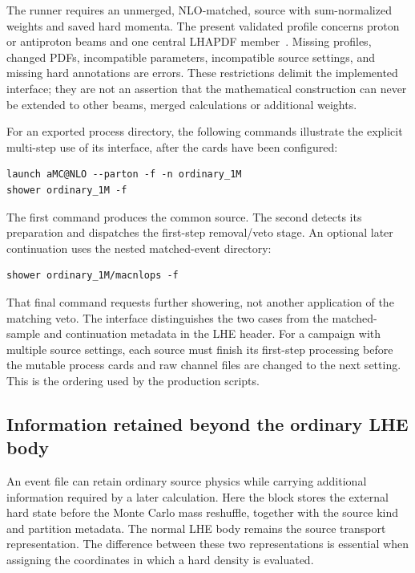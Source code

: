 The runner requires an unmerged, NLO-matched, \pythia{} source with
sum-normalized weights and saved hard momenta.  The present validated
profile concerns proton or antiproton beams and one central LHAPDF
member~\cite{LHAPDF}.  Missing profiles, changed PDFs, incompatible
parameters, incompatible source settings, and missing hard annotations
are errors.  These restrictions delimit the implemented interface;
they are not an assertion that the mathematical construction can never
be extended to other beams, merged calculations or additional weights.

For an exported process directory, the following commands illustrate
the explicit multi-step use of its 
interface, after the cards have been configured:
\begin{verbatim}
launch aMC@NLO --parton -f -n ordinary_1M
shower ordinary_1M -f
\end{verbatim}
The first command produces the common source.  The second detects its
\macnlops{} preparation and dispatches the first-step removal/veto
stage.  An optional later continuation uses the nested matched-event
directory:
\begin{verbatim}
shower ordinary_1M/macnlops -f
\end{verbatim}
That final command requests further showering, not another application
of the matching veto.  The interface distinguishes the two cases from
the matched-sample and continuation metadata in the LHE header.
For a campaign with multiple source settings, each source must finish
its first-step processing before the mutable process cards and raw
channel files are changed to the next setting.  This is the ordering
used by the production scripts.

\subsection{Information retained beyond the ordinary LHE body}
\label{sec:impl-provenance}

An event file can retain ordinary source physics while carrying
additional information required by a later calculation.  Here the
 block stores the external hard
state before the Monte Carlo mass reshuffle, together with the source
kind and partition metadata.  The normal LHE body remains the source
transport representation.  The difference between these two
representations is essential when assigning the coordinates in which a
hard density is evaluated.

